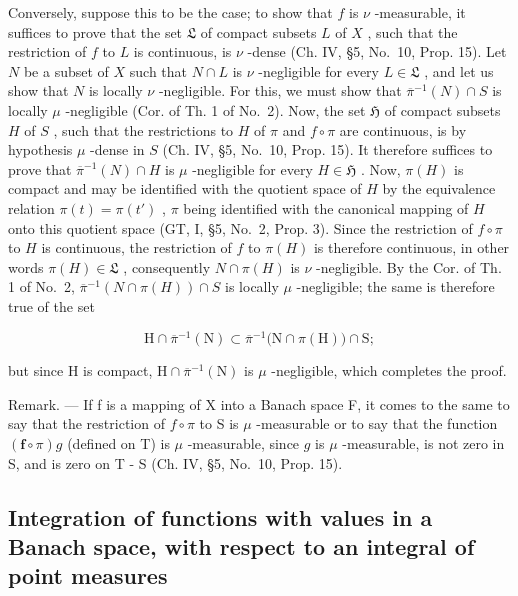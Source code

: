 Conversely, suppose this to be the case; to show that \(f\) is \(\nu\) -measurable, it suffices to prove that the set \(\mathfrak{L}\) of compact subsets \(L\) of \(X\) , such that the restriction of \(f\) to \(L\) is continuous, is \(\nu\) -dense (Ch. IV, §5, No.~10, Prop. 15). Let \(N\) be a subset of \(X\) such that \(N \cap L\) is \(\nu\) -negligible for every \(L \in \mathfrak{L}\) , and let us show that \(N\) is locally \(\nu\) -negligible. For this, we must show that \(\overline{\pi}^{-1}(N) \cap S\) is locally \(\mu\) -negligible (Cor. of Th. 1 of No.~2). Now, the set \(\mathfrak{H}\) of compact subsets \(H\) of \(S\) , such that the restrictions to \(H\) of \(\pi\) and \(f \circ \pi\) are continuous, is by hypothesis \(\mu\) -dense in \(S\) (Ch. IV, §5, No.~10, Prop. 15). It therefore suffices to prove that \(\overline{\pi}^{-1}(N) \cap H\) is \(\mu\) -negligible for every \(H \in \mathfrak{H}\) . Now, \(\pi(H)\) is compact and may be identified with the quotient space of \(H\) by the equivalence relation \(\pi(t) = \pi(t')\) , \(\pi\) being identified with the canonical mapping of \(H\) onto this quotient space (GT, I, §5, No.~2, Prop. 3). Since the restriction of \(f \circ \pi\) to \(H\) is continuous, the restriction of \(f\) to \(\pi(H)\) is therefore continuous, in other words \(\pi(H) \in \mathfrak{L}\) , consequently \(N \cap \pi(H)\) is \(\nu\) -negligible. By the Cor. of Th. 1 of No.~2, \(\overline{\pi}^{-1}(N \cap \pi(H)) \cap S\) is locally \(\mu\) -negligible; the same is therefore true of the set

\[
\mathrm{H} \cap \overline {{\pi}} ^ {- 1} (\mathrm{N}) \subset \overline {{\pi}} ^ {- 1} \bigl (\mathrm{N} \cap \pi (\mathrm{H}) \bigr) \cap \mathrm{S};
\]

but since H is compact, \(\mathrm{H} \cap \overline{\pi}^{-1}(\mathrm{N})\) is \(\mu\) -negligible, which completes the proof.

Remark. --- If f is a mapping of X into a Banach space F, it comes to the same to say that the restriction of \(f \circ \pi\) to S is \(\mu\) -measurable or to say that the function \((\mathbf{f} \circ \pi)g\) (defined on T) is \(\mu\) -measurable, since \(g\) is \(\mu\) -measurable, is not zero in S, and is zero on T - S (Ch. IV, §5, No.~10, Prop. 15).

\subsection{Integration of functions with values in a Banach space, with respect to an integral of point measures}

